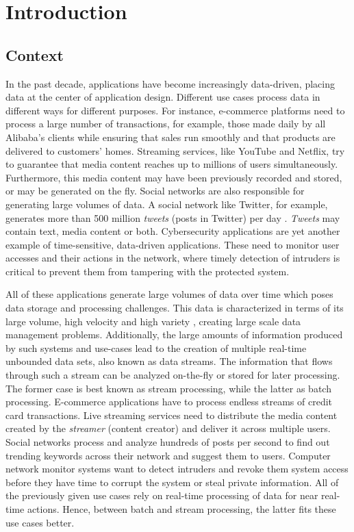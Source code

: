 \chapter{Introduction} \label{chap:intro} \minitoc

\section{Context} \label{sec:context}
In the past decade, applications have become increasingly data-driven, placing data at the center of application design. Different use cases process data in different ways for different purposes. For instance, e-commerce platforms need to process a large number of transactions, for example, those made daily by all Alibaba's clients while ensuring that sales run smoothly and that products are delivered to customers' homes. Streaming services, like YouTube and Netflix, try to guarantee that media content reaches up to millions of users simultaneously. Furthermore, this media content may have been previously recorded and stored, or may be generated on the fly. Social networks are also responsible for generating large volumes of data. A social network like Twitter, for example, generates more than 500 million \textit{tweets} (posts in Twitter) per day \cite{twitter-throughput}. \textit{Tweets} may contain text, media content or both. Cybersecurity applications are yet another example of time-sensitive, data-driven applications. These need to monitor user accesses and their actions in the network, where timely detection of intruders is critical to prevent them from tampering with the protected system.

All of these applications generate large volumes of data over time which poses data storage and processing challenges. This data is characterized in terms of its large volume, high velocity and high variety \cite{Mavragani-GoogleTrends-SLR}, creating large scale data management problems. Additionally, the large amounts of information produced by such systems and use-cases lead to the creation of multiple real-time unbounded data sets, also known as data streams. The information that flows through such a stream can be analyzed on-the-fly or stored for later processing. The former case is best known as stream processing, while the latter as batch processing. E-commerce applications have to process endless streams of credit card transactions. Live streaming services need to distribute the media content created by the \textit{streamer} (content creator) and deliver it across multiple users. Social networks process and analyze hundreds of posts per second to find out trending keywords across their network and suggest them to users. Computer network monitor systems want to detect intruders and revoke them system access before they have time to corrupt the system or steal private information. All of the previously given use cases rely on real-time processing of data for near real-time actions. Hence, between batch and stream processing, the latter fits these use cases better.


